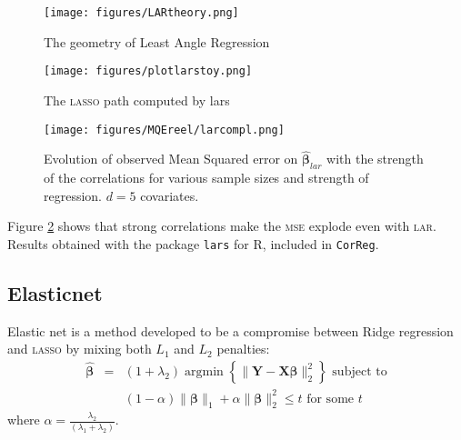 \documentclass[12pt,a4paper]{report}
\begin{document}
\begin{figure}[h!]
	\centering
		  \texttt{[image: figures/LARtheory.png]}
		\caption{The geometry of Least Angle Regression}
	\end{figure}
				
\begin{figure}[h!]
	\centering
		  \texttt{[image: figures/plotlarstoy.png]}
		\caption{The \textsc{lasso} path computed by lars}\label{plotlarstoy}
	\end{figure}			
	
		 \begin{figure}
	 \centering
	  \texttt{[image: figures/MQEreel/larcompl.png]}
	  \caption{Evolution of observed Mean Squared error on $\hat{\boldsymbol{\beta}}_{lar}$ with the strength of the correlations for various sample sizes and strength of regression. $d=5$ covariates. } \label{MQElarcompl}
	\end{figure}	
	 Figure \ref{MQElarcompl} shows that strong correlations make the \textsc{mse} explode even with \textsc{lar}. Results obtained with the package {\tt lars} for R, included in {\tt CorReg}.
 	 
	 \FloatBarrier
		\subsection{Elasticnet}		%

			Elastic net \cite{zou2005regularization} is a method developed to be a compromise between Ridge regression and \textsc{lasso} by mixing both $L_1$ and $L_2$ penalties: 
	\begin{eqnarray}
		\boldsymbol{\hat{\beta}}&=&(1+\lambda_2) \operatorname{argmin}\left\lbrace \parallel \boldsymbol{Y}-\boldsymbol{X\beta} \parallel_2^2 \right\rbrace \textrm{ subject to} \nonumber \\
			 & &(1-\alpha)\parallel\boldsymbol{\beta}\parallel_1+\alpha\parallel\boldsymbol{\beta}\parallel_2^2\leq t \textrm{ for some } t
	\end{eqnarray}
	where $\alpha=\frac{\lambda_2}{(\lambda_1+\lambda_2)}$. 
	
\end{document}
